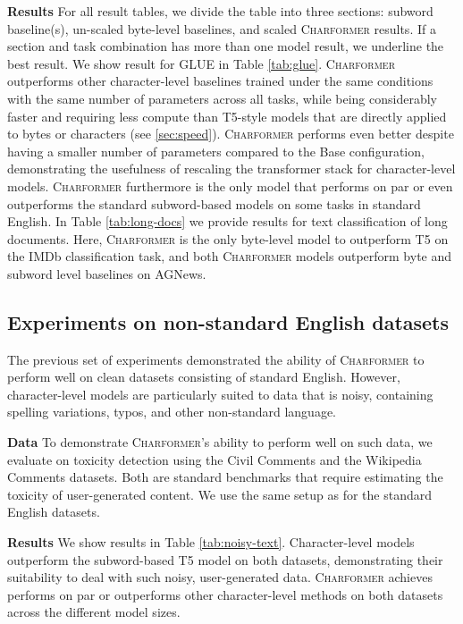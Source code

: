 \documentclass{article} \usepackage{iclr2022_conference,times}
\newcommand{\charformer}{\textsc{Charformer}\xspace}
\newcommand{\charformertall}{\textsc{Charformer}\xspace}
\begin{document}
\noindent \textbf{Results}   For all result tables, we divide the table into three sections: subword baseline(s), un-scaled byte-level baselines, and scaled \charformer results. If a section and task combination has more than one model result, we underline the best result. We show result for GLUE in Table \ref{tab:glue}. \charformer outperforms other character-level baselines trained under the same conditions with the same number of parameters across all tasks, while being considerably faster and requiring less compute than T5-style models that are directly applied to bytes or characters (see \textsection \ref{sec:speed}). \charformertall performs even better despite having a smaller number of parameters compared to the Base configuration, demonstrating the usefulness of rescaling the transformer stack for character-level models. \charformertall furthermore is the only model that performs on par or even outperforms the standard subword-based models on some tasks in standard English. In Table \ref{tab:long-docs} we provide results for text classification of long documents. Here, \charformertall is the only byte-level model to outperform T5 on the IMDb classification task, and both \charformer models outperform byte and subword level baselines on AGNews.

\subsection{Experiments on non-standard English datasets}

The previous set of experiments demonstrated the ability of \charformer to perform well on clean datasets consisting of standard English. However, character-level models are particularly suited to data that is noisy, containing spelling variations, typos, and other non-standard language. 

\noindent \textbf{Data}  To demonstrate \charformer's ability to perform well on such data, we evaluate on toxicity detection using the Civil Comments \citep{DBLP:journals/corr/abs-1903-04561} and the Wikipedia Comments \citep{10.1145/3038912.3052591} datasets. Both are standard benchmarks that require estimating the toxicity of user-generated content. We use the same setup as for the standard English datasets.

\noindent \textbf{Results}  We show results in Table \ref{tab:noisy-text}. Character-level models outperform the subword-based T5 model on both datasets, demonstrating their suitability to deal with such noisy, user-generated data. \charformer achieves performs on par or outperforms other character-level methods on both datasets across the different model sizes.
\end{document}
